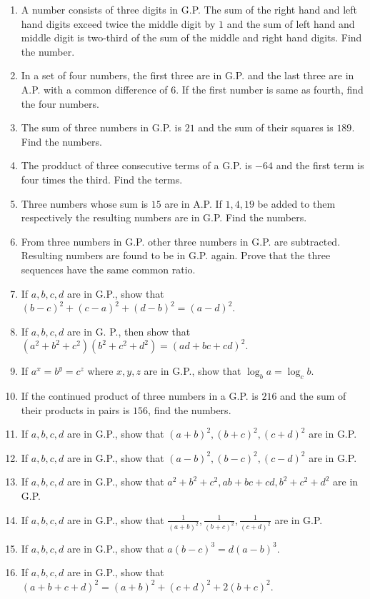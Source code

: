 \begin{enumerate}
\item A number consists of three digits in G.P. The sum of the right hand and left hand digits exceed twice the middle digit by $1$
  and the sum of left hand and middle digit is two-third of the sum of the middle and right hand digits. Find the number.
\item In a set of four numbers, the first three are in G.P. and the last three are in A.P. with a common difference of $6$. If the
  first number is same as fourth, find the four numbers.
\item The sum of three numbers in G.P. is $21$ and the sum of their squares is $189$. Find the numbers.
\item The prodduct of three consecutive terms of a G.P. is $-64$ and the first term is four times the third. Find the terms.
\item Three numbers whose sum is $15$ are in A.P. If $1, 4, 19$ be added to them respectively the resulting numbers are in
  G.P. Find the numbers.
\item From three numbers in G.P. other three numbers in G.P. are subtracted. Resulting numbers are found to be in G.P. again. Prove
  that the three sequences have the same common ratio.
\item If $a, b, c, d$ are in G.P., show that $(b - c)^2 + (c - a)^2 + (d - b)^2 = (a - d)^2$.
\item If $a,b,c,d$ are in G. P., then show that $(a^2 + b^2 + c^2)(b^2 + c^2 + d^2) = (ad + bc + cd)^2$.
\item If $a^x = b^y = c^z$ where $x, y, z$ are in G.P., show that $\log_ba = \log_cb$.
\item If the continued product of three numbers in a G.P. is $216$ and the sum of their products in pairs is $156$, find the
  numbers.
\item If $a, b, c, d$ are in G.P., show that $(a + b)^2, (b + c)^2, (c + d)^2$ are in G.P.
\item If $a, b, c, d$ are in G.P., show that $(a - b)^2, (b - c)^2, (c - d)^2$ are in G.P.
\item If $a, b, c, d$ are in G.P., show that $a^2 + b^2 + c^2, ab + bc + cd, b^2 + c^2 + d^2$ are in G.P.
\item If $a, b, c, d$ are in G.P., show that $\frac{1}{(a + b)^2}, \frac{1}{(b + c)^2}, \frac{1}{(c + d)^2}$ are in G.P.
\item If $a, b, c, d$ are in G.P., show that $a(b - c)^3 = d(a - b)^3$.
\item If $a, b, c, d$ are in G.P., show that $(a + b + c + d)^2 = (a + b)^2 + (c + d)^2 + 2(b + c)^2$.

\end{enumerate}
